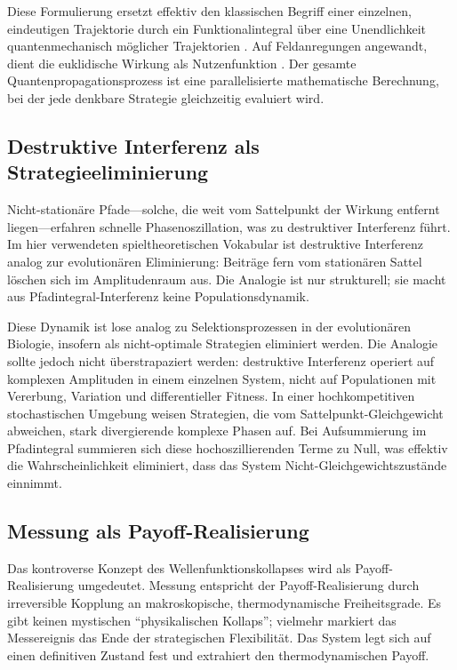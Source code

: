 \documentclass[12pt,a4paper]{article}
\theoremstyle{remark}
\begin{document}
Diese Formulierung ersetzt effektiv den klassischen Begriff einer einzelnen, eindeutigen Trajektorie durch ein Funktionalintegral \"uber eine Unendlichkeit quantenmechanisch m\"oglicher Trajektorien \citep{PathIntegral}. Auf Feldanregungen angewandt, dient die euklidische Wirkung als Nutzenfunktion \citep{PathIntegralOptimization}. Der gesamte Quantenpropagationsprozess ist eine parallelisierte mathematische Berechnung, bei der jede denkbare Strategie gleichzeitig evaluiert wird.

\subsection{Destruktive Interferenz als Strategieeliminierung}

Nicht-station\"are Pfade---solche, die weit vom Sattelpunkt der Wirkung entfernt liegen---erfahren schnelle Phasenoszillation, was zu destruktiver Interferenz f\"uhrt. Im hier verwendeten spieltheoretischen Vokabular ist destruktive Interferenz analog zur evolution\"aren Eliminierung: Beitr\"age fern vom station\"aren Sattel l\"oschen sich im Amplitudenraum aus. Die Analogie ist nur strukturell; sie macht aus Pfadintegral-Interferenz keine Populationsdynamik.

Diese Dynamik ist lose analog zu Selektionsprozessen in der evolution\"aren Biologie, insofern als nicht-optimale Strategien eliminiert werden. Die Analogie sollte jedoch nicht \"uberstrapaziert werden: destruktive Interferenz operiert auf komplexen Amplituden in einem einzelnen System, nicht auf Populationen mit Vererbung, Variation und differentieller Fitness. In einer hochkompetitiven stochastischen Umgebung weisen Strategien, die vom Sattelpunkt-Gleichgewicht abweichen, stark divergierende komplexe Phasen auf. Bei Aufsummierung im Pfadintegral summieren sich diese hochoszillierenden Terme zu Null, was effektiv die Wahrscheinlichkeit eliminiert, dass das System Nicht-Gleichgewichtszust\"ande einnimmt.

\subsection{Messung als Payoff-Realisierung}

Das kontroverse Konzept des Wellenfunktionskollapses wird als Payoff-Realisierung umgedeutet. Messung entspricht der Payoff-Realisierung durch irreversible Kopplung an makroskopische, thermodynamische Freiheitsgrade. Es gibt keinen mystischen ``physikalischen Kollaps''; vielmehr markiert das Messereignis das Ende der strategischen Flexibilit\"at. Das System legt sich auf einen definitiven Zustand fest und extrahiert den thermodynamischen Payoff.
\end{document}
